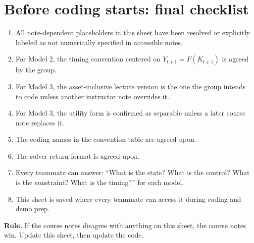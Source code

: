 \documentclass[11pt]{article}
\begin{document}
\section{Before coding starts: final checklist}

\begin{enumerate}[label=\textbf{\arabic*.}]
    \item All note-dependent placeholders in this sheet have been resolved or explicitly labeled as not numerically specified in accessible notes.
    \item For Model 2, the timing convention centered on $Y_{t+1} = F(K_{t+1})$ is agreed by the group.
    \item For Model 3, the asset-inclusive lecture version is the one the group intends to code unless another instructor note overrides it.
    \item For Model 3, the utility form is confirmed as separable unless a later course note replaces it.
    \item The coding names in the convention table are agreed upon.
    \item The solver return format is agreed upon.
    \item Every teammate can answer: ``What is the state? What is the control? What is the constraint? What is the timing?'' for each model.
    \item This sheet is saved where every teammate can access it during coding and demo prep.
\end{enumerate}

\begin{goalbox}
\textbf{Rule.} If the course notes disagree with anything on this sheet, the course notes win. Update this sheet, then update the code.
\end{goalbox}
\end{document}
